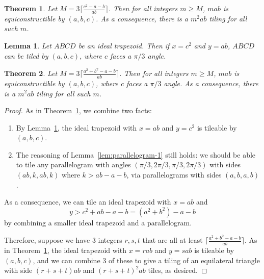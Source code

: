 \documentclass[10pt,a4paper]{amsart}
\newtheorem{lem}{Lemma}
\newtheorem{thm}{Theorem}
\begin{document}
\begin{thm}
    \label{thm:equilateral-construction-1} Let $M = 3\lceil \frac{c^2 - a - b}{ab} \rceil$. Then for all integers $m \geq M$, $mab$ is equiconstructible by $(a,b,c)$. As a consequence, there is a $m^2 ab$ tiling for all such $m$.
\end{thm}

\begin{lem}
    \label{lem:trapezoid-simple-alt} Let $ABCD$ be an ideal trapezoid.  Then if $x = c^2$ and $y = ab$, $ABCD$ can be tiled by $(a,b,c)$, where $c$ faces a $\pi/3$ angle.
\end{lem}

\begin{thm}
    \label{thm:equilateral-construction-2} Let $M = 3\lceil \frac{a^2+b^2 - a - b}{ab} \rceil$. Then for all integers $m \geq M$, $mab$ is equiconstructible by $(a,b,c)$, where $c$ faces a $\pi/3$ angle. As a consequence, there is a $m^2 ab$ tiling for all such $m$.
\end{thm}

\begin{proof}
As in  Theorem~\ref{thm:equilateral-construction-1}, we combine two facts:
\begin{enumerate}
    \item By Lemma~\ref{lem:trapezoid-simple-alt}, the ideal trapezoid with $x=ab$ and $y=c^2$ is tileable by $(a,b,c).$ 
    \item The reasoning of Lemma~\ref{lem:parallelogram-1} still holds: we should be able to tile any parallelogram with angles $(\pi/3, 2\pi/3, \pi/3, 2\pi/3)$ with sides $(ab,k,ab,k)$ where $k > ab-a-b$, via parallelograms with sides $(a,b,a,b)$.
\end{enumerate} 
As a consequence, we can  tile an ideal trapezoid with $x=ab$ and 
$$y > c^2 + ab-a-b = (a^2 + b^2) - a - b$$
by combining a smaller ideal trapezoid and a parallelogram.

Therefore, suppose we have $3$ integers $r, s, t$ that are all at least $\lceil \frac{a^2+b^2 - a - b}{ab} \rceil$. As in Theorem~\ref{thm:equilateral-construction-1}, the ideal trapezoid with $x=rab$ and $y=sab$ is tileable by $(a,b,c)$, and we can combine $3$ of these to give a tiling of an equilateral triangle with side $(r+s+t)ab$ and $(r+s+t)^2ab$ tiles, as desired.
\end{proof}
\end{document}
